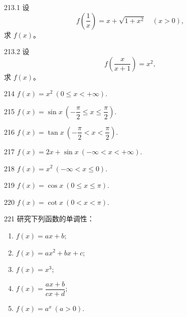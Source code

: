 \begin{prob}[M]{213.1}
设
\[
f\!\left(\frac{1}{x}\right) = x + \sqrt{1 + x^2} \quad (x > 0),
\]
求 $f(x)$。
\end{prob}

\begin{prob}[M]{213.2}
设
\[
f\!\left(\frac{x}{x + 1}\right) = x^2,
\]
求 $f(x)$。
\end{prob}


\begin{prob}[S]{214}
$f(x) = x^2\ (0 \leqslant x < +\infty)$.
\end{prob}

\begin{prob}[S]{215}
$f(x) = \sin x\ \left(-\dfrac{\pi}{2} \leqslant x \leqslant \dfrac{\pi}{2}\right)$.
\end{prob}

\begin{prob}[S]{216}
$f(x) = \tan x\ \left(-\dfrac{\pi}{2} < x < \dfrac{\pi}{2}\right)$.
\end{prob}

\begin{prob}[M]{217}
$f(x) = 2x + \sin x\ (-\infty < x < +\infty)$.
\end{prob}


\begin{prob}[S]{218}
$f(x) = x^2\ (-\infty < x \leqslant 0)$.
\end{prob}

\begin{prob}[S]{219}
$f(x) = \cos x\ (0 \leqslant x \leqslant \pi)$.
\end{prob}

\begin{prob}[S]{220}
$f(x) = \cot x\ (0 < x < \pi)$.
\end{prob}

\begin{prob}[L]{221}
研究下列函数的单调性：
\begin{enumerate}[label=(\alph*), itemsep=2pt, topsep=3pt]
\item $f(x) = ax + b$;
\item $f(x) = ax^2 + bx + c$;
\item $f(x) = x^3$;
\item $f(x) = \dfrac{ax + b}{cx + d}$;
\item $f(x) = a^x\ (a > 0)$.
\end{enumerate}
\end{prob}

